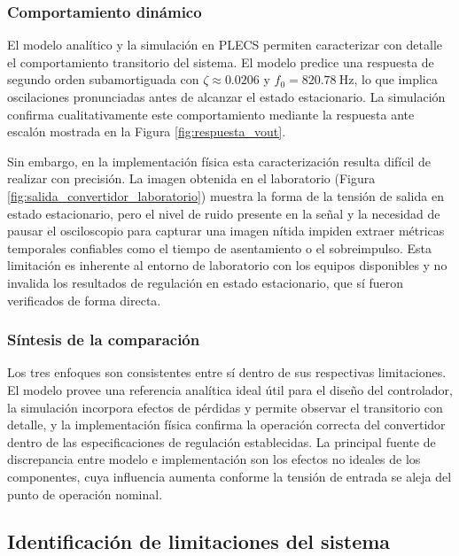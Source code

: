 \documentclass[conference]{IEEEtran}
\begin{document}
\subsubsection{Comportamiento dinámico}

El modelo analítico y la simulación en PLECS permiten caracterizar con detalle el
comportamiento transitorio del sistema. El modelo predice una respuesta de segundo
orden subamortiguada con $\zeta \approx 0.0206$ y $f_0 = 820.78~\mathrm{Hz}$, lo
que implica oscilaciones pronunciadas antes de alcanzar el estado estacionario. La
simulación confirma cualitativamente este comportamiento mediante la respuesta ante
escalón mostrada en la Figura \ref{fig:respuesta_vout}.

Sin embargo, en la implementación física esta caracterización resulta difícil de
realizar con precisión. La imagen obtenida en el laboratorio (Figura
\ref{fig:salida_convertidor_laboratorio}) muestra la forma de la tensión de salida
en estado estacionario, pero el nivel de ruido presente en la señal y la
necesidad de pausar el osciloscopio para capturar una imagen nítida impiden extraer
métricas temporales confiables como el tiempo de asentamiento o el sobreimpulso. Esta
limitación es inherente al entorno de laboratorio con los equipos disponibles y no
invalida los resultados de regulación en estado estacionario, que sí fueron verificados
de forma directa.

\subsubsection{Síntesis de la comparación}

Los tres enfoques son consistentes entre sí dentro de sus respectivas limitaciones.
El modelo provee una referencia analítica ideal útil para el diseño del controlador,
la simulación incorpora efectos de pérdidas y permite observar el transitorio con
detalle, y la implementación física confirma la operación correcta del convertidor
dentro de las especificaciones de regulación establecidas. La principal fuente de
discrepancia entre modelo e implementación son los efectos no ideales de los
componentes, cuya influencia aumenta conforme la tensión de entrada se aleja del
punto de operación nominal.


\subsection{Identificación de limitaciones del sistema}
\end{document}
